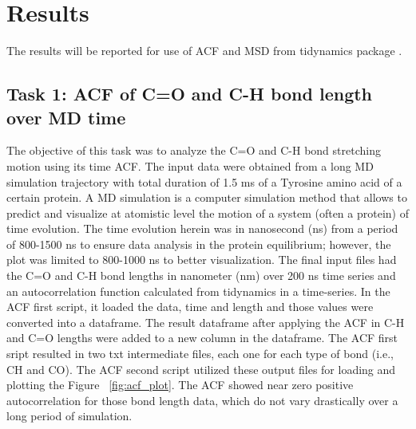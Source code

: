 \documentclass{article}
\begin{document}
\section{Results}

The results will be reported for use of ACF and MSD from tidynamics package \cite{Buyl2018}.

\subsection{Task 1: ACF of C=O and C-H bond length over MD time}

The objective of this task was to analyze the C=O and C-H bond stretching motion using its time ACF. The input data were obtained from a long MD simulation trajectory with total duration of 1.5 ms of a Tyrosine amino acid of a certain protein. A MD simulation is a computer simulation method that allows to predict and visualize at atomistic level the motion of a system (often a protein) of time evolution. The time evolution herein was in nanosecond (ns) from a period of 800-1500 ns to ensure data analysis in the protein equilibrium; however, the plot was limited to 800-1000 ns to better visualization. The final input files had the C=O and C-H bond lengths in nanometer (nm) over 200 ns time series and an autocorrelation function calculated from tidynamics \cite{Buyl2018}in a time-series. In the ACF first script, it loaded the data, time and length and those values were converted into a dataframe. The result dataframe after applying the ACF in C-H and C=O lengths were added to a new column in the dataframe. The ACF first sript resulted in two txt intermediate files, each one for each type of bond (i.e., CH and CO). The ACF second script utilized these output files for loading and plotting the Figure ~\ref{fig:acf_plot}. The ACF showed near zero positive autocorrelation for those bond length data, which do not vary drastically over a long period of simulation.
\end{document}
